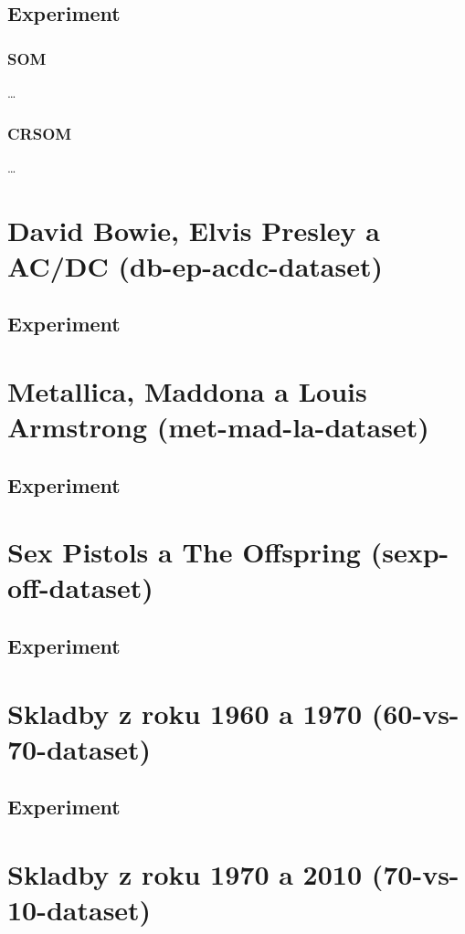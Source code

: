 \documentclass[thesis=M,czech]{FITthesis}[2012/06/26]
\begin{document}
\subsection{Experiment}\label{exp:kp_ram}
\subsubsection*{SOM}
\dots
\subsubsection*{CRSOM}
\dots

\section{David Bowie, Elvis Presley a AC/DC (db-ep-acdc-dataset)}\label{app:db-ep-acdc-dataset}
\subsection{Experiment}\label{exp:db-ep-acdc}


\section{Metallica, Maddona a Louis Armstrong (met-mad-la-dataset)}\label{app:met-mad-la}
\subsection{Experiment}\label{exp:met-mad-la}

\section{Sex Pistols a The Offspring (sexp-off-dataset)}\label{app:sexp-off}
\subsection{Experiment}\label{exp:sexp-off}


\section{Skladby z roku 1960 a 1970 (60-vs-70-dataset)}\label{app:60vs70dataset}
\subsection{Experiment}\label{exp:60-vs-70}


\section{Skladby z roku 1970 a 2010 (70-vs-10-dataset)}\label{app:70vs10dataset}
\end{document}
